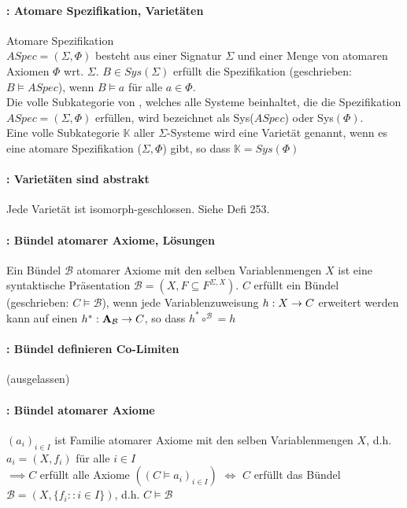 \paragraph{: Atomare Spezifikation, Varietäten} 
Atomare Spezifikation \\ $ASpec = (\Sigma, \Phi)$ besteht aus einer Signatur $\Sigma$ und einer Menge von atomaren Axiomen $\Phi$ wrt. $\Sigma$.
$B \in Sys(\Sigma) $ erfüllt die Spezifikation (geschrieben: $B \models ASpec$), wenn $B \models a$ für alle $a \in \Phi$. \\
Die volle Subkategorie von \syssig, welches alle Systeme beinhaltet, die die Spezifikation $ASpec = (\Sigma, \Phi)$ erfüllen, wird bezeichnet als Sys($ASpec$) oder Sys$(\Phi)$. \\
Eine volle Subkategorie $\mathbb{K}$ aller $\Sigma$-Systeme wird eine Varietät genannt, wenn es eine atomare Spezifikation ($\Sigma, \Phi$) gibt, so dass $\mathbb{K} = Sys(\Phi)$


\paragraph{: Varietäten sind abstrakt} 
Jede Varietät ist isomorph-geschlossen. Siehe Defi 253.

\paragraph{: Bündel atomarer Axiome, Lösungen} 
Ein Bündel $\mathcal{B}$ atomarer Axiome mit den selben Variablenmengen $X$ ist eine syntaktische Präsentation $\mathcal{B} = (X, F \subseteq F^{\Sigma, X})$.
$C$ erfüllt ein Bündel (geschrieben: $C \models \mathcal{B}$), wenn jede Variablenzuweisung $h: X \rightarrow C$ erweitert werden kann auf einen \homo $h^*: \mathbf{A}_\mathcal{B} \rightarrow C$, so dass $h^* \circ^\mathcal{B} = h$


\paragraph{: Bündel definieren Co-Limiten} 
(ausgelassen)

\paragraph{: Bündel atomarer Axiome} 

$(a_i)_{i \in I}$ ist Familie atomarer Axiome mit den selben Variablenmengen $X$, d.h. $a_i = (X, f_i)$ für alle $i \in I$ \\ 
$\implies C $ erfüllt alle Axiome $((C \models a_i )_{i \in I})$ $\Leftrightarrow$ $C$ erfüllt das Bündel $\mathcal{B} = (X, \{f_i:: i \in I \})$, d.h. $C \models \mathcal{B}$ 

